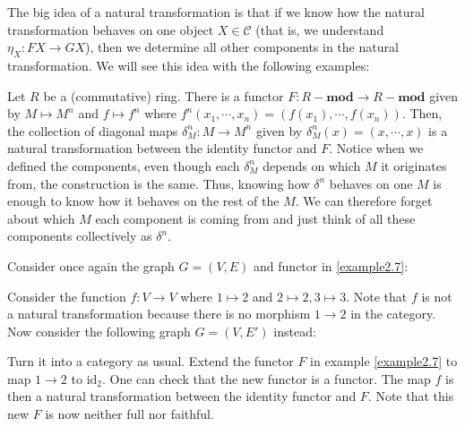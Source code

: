 \documentclass[12pt,reqno]{amsart}
\numberwithin{theorem}{section}
\theoremstyle{definition}
\theoremstyle{remark}
\numberwithin{equation}{section}
\newcommand{\cC}{\mathcal{C}}
\theoremstyle{definition}
\begin{document}
The big idea of a natural transformation is that if we know how the natural transformation behaves on one object $X \in \cC$ (that is, we understand $\eta_X:FX\rightarrow GX$), then we determine all other components in the natural transformation. We will see this idea with the following examples:
\begin{example}
    Let $R$ be a (commutative) ring. There is a functor $F:R-\mathbf{mod}\rightarrow R-\mathbf{mod}$ given by $M \mapsto M^n$ and $f\mapsto f^n$ where $f^n(x_1,\cdots,x_n) = (f(x_1),\cdots,f(x_n))$. Then, the collection of diagonal maps $\delta^n_M:M \rightarrow M^n$ given by $\delta^n_M(x) = (x,\cdots,x)$ is a natural transformation between the identity functor and $F$. Notice when we defined the components, even though each $\delta^n_M$ depends on which $M$ it originates from, the construction is the same. Thus, knowing how $\delta^n$ behaves on one $M$ is enough to know how it behaves on the rest of the $M$. We can therefore forget about which $M$ each component is coming from and just think of all these components collectively as $\delta^n$.
\end{example}
\begin{example}
    Consider once again the graph $G=(V,E)$ and functor in \ref{example2.7}:
    \begin{center}
    \end{center}
    Consider the function $f:V\rightarrow V$ where $1 \mapsto 2$ and $2\mapsto 2, 3\mapsto 3$. Note that $f$ is not a natural transformation because there is no morphism $1 \rightarrow 2$ in the category. Now consider the following graph $G=(V,E')$ instead:
     \begin{center}
    \end{center}
    Turn it into a category as usual. Extend the functor $F$ in example \ref{example2.7} to map $1\rightarrow 2$ to $\mathrm{id}_2$. One can check that the new functor is a functor. The map $f$ is then a natural transformation between the identity functor and $F$. Note that this new $F$ is now neither full nor faithful.
\end{example}
\end{document}

